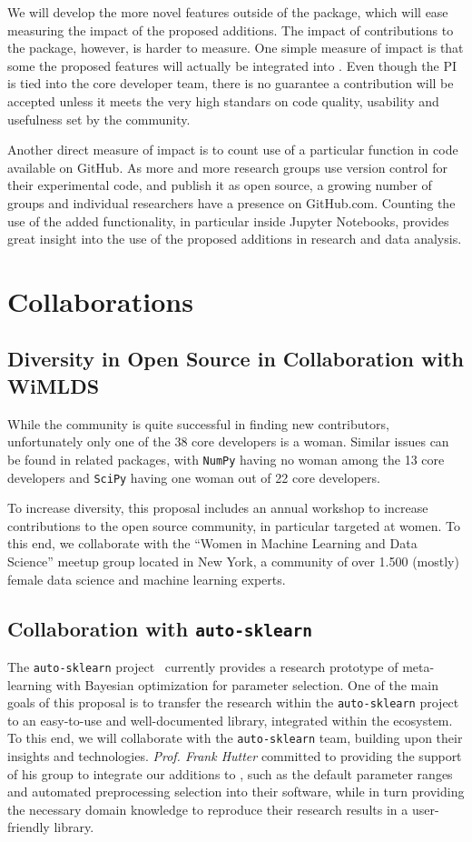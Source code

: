 We will develop the more novel features outside of the \sklearn{} package, which will
ease measuring the impact of the proposed additions. The impact of contributions
to the \sklearn{} package, however, is harder to measure. One simple measure of impact
is that some the proposed features will actually be integrated into \sklearn{}.
Even though the PI is tied into the core developer team, there is no guarantee
a contribution will be accepted unless it meets the very high standars
on code quality, usability and usefulness set by the community.

Another direct measure of impact is to count use of a particular function in
code available on GitHub. As more and more research groups use version
control for their experimental code, and publish it as open source, a growing
number of groups and individual researchers have a presence on GitHub.com.
Counting the use of the added functionality, in particular inside Jupyter
Notebooks, provides great insight into the use of the proposed additions in
research and data analysis.


\section{Collaborations}
\subsection{Diversity in Open Source in Collaboration with WiMLDS}
While the \sklearn{} community is quite successful in finding new contributors,
unfortunately only one of the 38 \sklearn{} core developers is a woman.
Similar issues can be found in related packages, with \texttt{NumPy} having no
woman among the 13 core developers and \texttt{SciPy} having one woman out of
22 core developers.

To increase diversity, this proposal includes an annual workshop to increase
contributions to the open source community, in particular targeted at women.
To this end, we collaborate with the ``Women in Machine Learning and Data Science''
meetup group located in New York, a community of over 1.500 (mostly) female data science and
machine learning experts.

\subsection{Collaboration with \texttt{auto-sklearn}}
The \texttt{auto-sklearn} project~\autocite{feurer-nips2015} currently provides
a research prototype of meta-learning with Bayesian optimization for parameter
selection. One of the main goals of this proposal is to transfer the research
within the \texttt{auto-sklearn} project to an easy-to-use and well-documented
library, integrated within the \sklearn{} ecosystem. To this end, we will
collaborate with the \texttt{auto-sklearn} team, building upon their insights
and technologies. \emph{Prof. Frank Hutter} committed to providing the support of his group
to integrate our additions to \sklearn{}, such as the default parameter ranges
and automated preprocessing selection into their software, while in turn
providing the necessary domain knowledge to reproduce their research results in
a user-friendly library.

